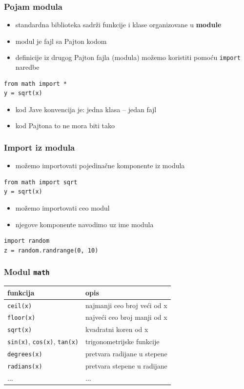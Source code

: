\documentclass[compress]{beamer}
\begin{document}
\begin{frame}[fragile]
\frametitle{Pojam modula}
\begin{itemize}
  \item standardna biblioteka sadrži funkcije i klase organizovane u \textbf{module}
  \item modul je fajl sa Pajton kodom
  \item definicije iz drugog Pajton fajla (modula) možemo koristiti pomoću \texttt{import} naredbe
\end{itemize}
\begin{verbatim}
from math import *
y = sqrt(x)
\end{verbatim}
\begin{itemize}
  \item kod Jave konvencija je: jedna klasa -- jedan fajl
  \item kod Pajtona to ne mora biti tako
\end{itemize}
\end{frame}

\begin{frame}[fragile]
\frametitle{Import iz modula}
\begin{itemize}
  \item možemo importovati pojedinačne komponente iz modula
\end{itemize}
\begin{verbatim}
from math import sqrt
y = sqrt(x)
\end{verbatim}
\begin{itemize}
  \item možemo importovati ceo modul
  \item njegove komponente navodimo uz ime modula
\end{itemize}
\begin{verbatim}
import random
z = random.randrange(0, 10)
\end{verbatim}
\end{frame}
  
\begin{frame}[fragile]
\frametitle{Modul \texttt{math}}
\begin{tabular}{lp{5cm}}
  \textbf{funkcija} & \textbf{opis} \\ \hline
  \texttt{ceil(x)} & najmanji ceo broj veći od x \\ \hline
  \texttt{floor(x)} & najveći ceo broj manji od x \\ \hline
  \texttt{sqrt(x)} & kvadratni koren od x \\ \hline
  \texttt{sin(x)}, \texttt{cos(x)}, \texttt{tan(x)} & trigonometrijske funkcije \\ \hline
  \texttt{degrees(x)} & pretvara radijane u stepene \\ \hline
  \texttt{radians(x)} & pretvara stepene u radijane \\ \hline
  ... & ...
\end{tabular}
\end{frame}
  
\end{document}
